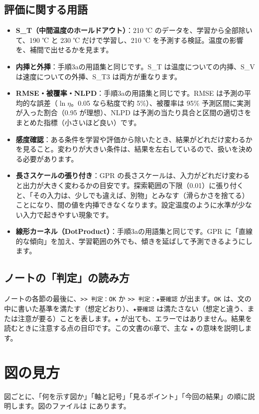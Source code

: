 \documentclass[paper=a4paper,fontsize=10.5pt,line_length=44zw,number_of_lines=38]{jlreq}
\newcommand{\file}[1]{\texttt{\detokenize{#1}}}
\newenvironment{termlist}{\begin{itemize}[label=・,leftmargin=1\zw,labelwidth=1\zw,labelsep=0pt,itemsep=0.4ex,topsep=0.6ex,parsep=0pt]}{\end{itemize}}
\newcommand{\term}[1]{\item \textbf{#1}：}
\begin{document}
\subsection{評価に関する用語}
\begin{termlist}
\term{S\_T（中間温度のホールドアウト）}210 ℃ のデータを、学習から全部除いて、190 ℃ と 230 ℃ だけで学習し、210 ℃ を予測する検証。温度の影響を、補間で出せるかを見ます。
\term{内挿と外挿}手順3aの用語集と同じです。S\_T は温度についての内挿、S\_V は速度についての外挿、S\_T3 は両方が重なります。
\term{RMSE・被覆率・NLPD}手順3aの用語集と同じです。RMSE は予測の平均的な誤差（$\ln\eta$。0.05 なら粘度で約 5\%）、被覆率は 95\% 予測区間に実測が入った割合（0.95 が理想）、NLPD は予測の当たり具合と区間の適切さをまとめた指標（小さいほど良い）です。
\term{感度確認}ある条件を学習や評価から除いたとき、結果がどれだけ変わるかを見ること。変わりが大きい条件は、結果を左右しているので、扱いを決める必要があります。
\term{長さスケールの張り付き}GPR の長さスケールは、入力がどれだけ変わると出力が大きく変わるかの目安です。探索範囲の下限（0.01）に張り付くと、「その入力は、少しでも違えば、別物」とみなす（滑らかさを捨てる）ことになり、間の値を内挿できなくなります。設定温度のように水準が少ない入力で起きやすい現象です。
\term{線形カーネル（DotProduct）}手順3aの用語集と同じです。GPR に「直線的な傾向」を加え、学習範囲の外でも、傾きを延ばして予測できるようにします。
\end{termlist}

\subsection{ノートの「判定」の読み方}
ノートの各節の最後に、\texttt{>> 判定：OK} か \texttt{>> 判定：★要確認} が出ます。\texttt{OK} は、文の中に書いた基準を満たす（想定どおり）、\texttt{★要確認} は満たさない（想定と違う、または注意が要る）ことを表します。\texttt{★} が出ても、エラーではありません。結果を読むときに注意する点の目印です。この文書の6章で、主な \texttt{★} の意味を説明します。

\section{図の見方}

図ごとに、「何を示す図か」「軸と記号」「見るポイント」「今回の結果」の順に説明します。図のファイルは \file{results/step3b/} にあります。

\end{document}
